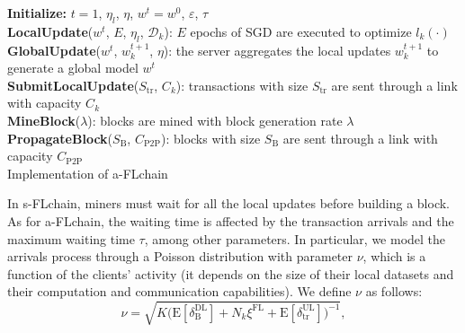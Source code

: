 \documentclass[lettersize,journal]{IEEEtran}
\begin{document}
\begin{algorithm}[ht!]	
	\SetAlgoLined
	\textbf{Initialize:} $t=1$, $\eta_l$, $\eta$, $w^t = w^0$, $\varepsilon$, $\tau$\\
	\textbf{LocalUpdate}($w^t$, $E$, $\eta_l$, $\mathcal{D}_k$): $E$ epochs of SGD are executed to optimize $l_k(\cdot)$\\
	\textbf{GlobalUpdate}($w^t$, $w_k^{t+1}$, $\eta$): the server aggregates the local updates $w_k^{t+1}$ to generate a global model $w^t$ \\
	\textbf{SubmitLocalUpdate}($S_\text{tr}$, $C^{}_k$): transactions with size $S_\text{tr}$ are sent through a link with capacity $C^{}_k$\\
	\textbf{MineBlock}($\lambda$): blocks are mined with block generation rate $\lambda$\\
	\textbf{PropagateBlock}($S_\text{B}$, $C_\text{P2P}$): blocks with size $S_\text{B}$ are sent through a link with capacity $C_\text{P2P}$\\  
	\caption{Implementation of a-FLchain}
	\label{alg:aflchain}			
\end{algorithm}

In s-FLchain, miners must wait for all the local updates before building a block. As for a-FLchain, the waiting time is affected by the transaction arrivals and the maximum waiting time $\tau$, among other parameters. In particular, we model the arrivals process through a Poisson distribution with parameter $\nu$, which is a function of the clients' activity (it depends on the size of their local datasets and their computation and communication capabilities). We define $\nu$ as follows:
\begin{equation}
\nu = \sqrt{K \Big( \text{E}[\delta_{\text{B}}^\text{DL}] + N_k\xi^\text{FL} + \text{E}[\delta_{\text{tr}}^\text{UL}] \Big)^{-1}},
\end{equation}
\end{document}
